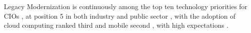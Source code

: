 \Gls{Legacy Modernization} is continuously among the top ten technology priorities for CIOs \autocite{Gartner2013CIOAgenda}, at position 5 in both industry \autocite{Gartner2013Priorities} and public sector \autocite{NASCIO2016}, with the adoption of cloud computing ranked third \autocite{Gartner2013Priorities,NASCIO2016} and mobile second \autocite{Gartner2013Priorities}, with high expectations \autocite{ForresterResearch2011Modernization}.


%

